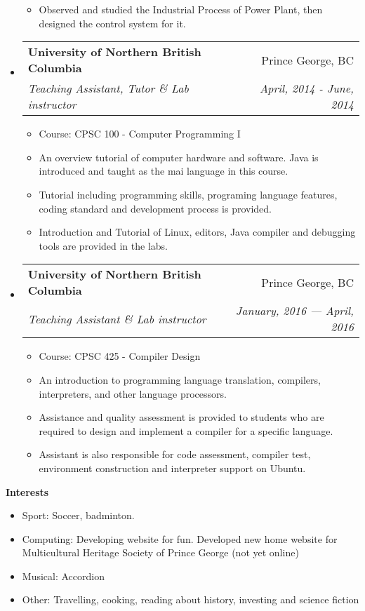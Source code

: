 \documentclass[letterpaper,11pt]{article}
\makeatletter
\newcommand{\resitem}[1]{\item #1 \vspace{-2pt}}
\newcommand{\resheading}[1]{{\large \colorbox{mygrey}{\begin{minipage}{\textwidth}{\textbf{#1 \vphantom{p\^{E}}}}\end{minipage}}}}
\newcommand{\ressubheading}[4]{
\begin{tabular*}{7.0in}{l@{\extracolsep{\fill}}r}
		\textbf{#1} & #2 \\
		\textit{#3} & \textit{#4} \\
\end{tabular*}\vspace{-6pt}}
\makeatother
\begin{document}
\begin{itemize}
\begin{itemize}
		\resitem{Observed and studied the Industrial Process of Power Plant, then designed the control system for it.}
	\end{itemize}
\item
	\ressubheading{University of Northern British Columbia}{Prince George, BC}{Teaching Assistant, Tutor \& Lab instructor}{April, 2014 - June, 2014}
	\begin{itemize}
		\resitem{Course: CPSC 100 - Computer Programming I}
		\resitem{An overview tutorial of computer hardware and software. Java is introduced and taught as the mai language in this course.}
		\resitem{Tutorial including programming skills, programing language features, coding standard and development process is provided.}
		\resitem{Introduction and Tutorial of Linux, editors, Java compiler and debugging tools are provided in the labs.}
	\end{itemize}
\item
	\ressubheading{University of Northern British Columbia}{Prince George, BC}{Teaching Assistant \& Lab instructor}{January, 2016 — April, 2016}
	\begin{itemize}
		\resitem{Course: CPSC 425 - Compiler Design}
		\resitem{An introduction to programming language translation, compilers, interpreters, and other language processors.}
		\resitem{Assistance and quality assessment is provided to students who are required to design and implement a compiler for a specific language.}
		\resitem{Assistant is also responsible for code assessment, compiler test, environment construction and interpreter support on Ubuntu.}
	\end{itemize}

\end{itemize}

\resheading{Interests}
\begin{itemize}
\item{Sport: Soccer, badminton.}
\item{Computing: Developing website for fun. Developed new home website for Multicultural Heritage Society of Prince George (not yet online)}
\item{Musical: Accordion}
\item{Other: Travelling, cooking, reading about history, investing and science fiction}
\end{itemize}
\end{document}
